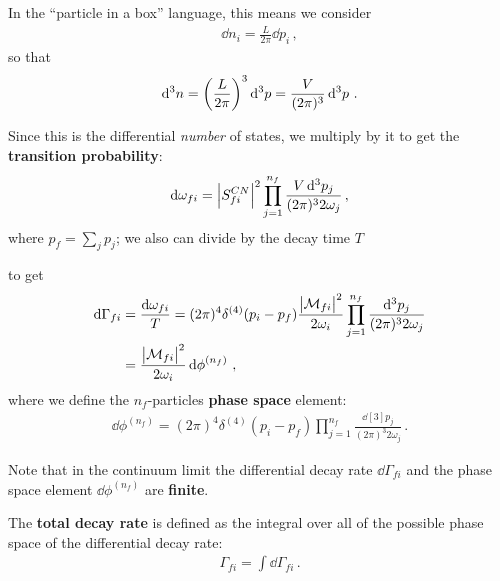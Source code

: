 \documentclass[main.tex]{subfiles}
\begin{document}
In the ``particle in a box'' language, this means we consider 
%
\begin{align}
\dd{n_i} = \frac{L}{2 \pi } \dd{p_i}
\,,
\end{align}
%
so that 
%
\begin{align}
\dd[3]{n} = \qty( \frac{L}{2 \pi })^3 \dd[3]{p} 
= \frac{V}{(2\pi )^3} \dd[3]{p} 
\,.
\end{align}


Since this is the differential \emph{number} of states, we multiply by it to get the \textbf{transition probability}:  
%
\begin{align} \label{eq:transition-probability}
\dd{\omega_{fi}} = \abs{S^{CN}_{fi}}^2 \prod_{j=1}^{n_f} \frac{V \dd[3]{p_j}}{(2\pi )^3 2 \omega_{j}}
\,,
\end{align}
%
where \(p_f = \sum_j p_j\); we also can divide by the decay time \(T\)


to get 
%
\begin{align}
\dd{\Gamma_{fi}} &= \frac{ \dd{\omega_{fi}}}{T} =
(2\pi )^{4} \delta^{(4)} (p_i - p_f) 
\frac{\abs{\mathcal{M}_{fi}}^2}{2 \omega_{i}}
\prod_{j=1}^{n_f} \frac{\dd[3]{p_j}}{(2\pi )^3 2 \omega_{j}}  \\
&= \frac{\abs{\mathcal{M}_{fi}}^2}{2 \omega_{i}} \dd{\phi}^{(n_f)}
\,,
\end{align}
%
where we define the \(n_f\)-particles \textbf{phase space} element: 
%
\begin{align}
\dd{\phi}^{(n_f)}
=
(2\pi )^{4} \delta^{(4)} (p_i - p_f) 
\prod_{j=1}^{n_f} \frac{\dd[3]{p_j}}{(2\pi )^3 2 \omega_{j}}
\,.
\end{align}

Note that in the continuum limit the differential decay rate \(\dd{\Gamma }_{fi}\) and the phase space element \(\dd{\phi }^{(n_f)}\) are \textbf{finite}. 

The \textbf{total decay rate} is defined as the integral over all of the possible phase space of the differential decay rate: 
%
\begin{align}
\Gamma_{fi} = \int \dd{\Gamma}_{fi}
\,.
\end{align}
\end{document}
